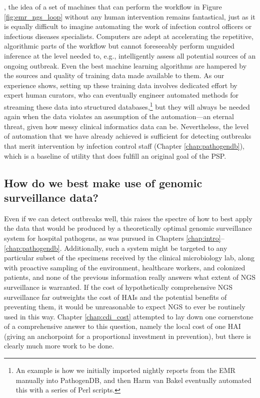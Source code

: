 , the idea of a set of machines that can perform the workflow in Figure \ref{fig:emr_ngs_loop} without any human intervention remains fantastical, just as it is equally difficult to imagine automating the work of infection control officers or infectious diseases specialists. Computers are adept at accelerating the repetitive, algorithmic parts of the workflow but cannot foreseeably perform unguided inference at the level needed to, e.g., intelligently assess all potential sources of an ongoing outbreak. Even the best machine learning algorithms are hampered by the sources and quality of training data made available to them. As our experience shows, setting up these training data involves dedicated effort by expert human curators, who can eventually engineer automated methods for streaming these data into structured databases,\footnote{An example is how we initially imported nightly reports from the EMR manually into PathogenDB, and then Harm van Bakel eventually automated this with a series of Perl scripts.} but they will always be needed again when the data violates an assumption of the automation—an eternal threat, given how messy clinical informatics data can be. Nevertheless, the level of automation that we have already achieved is sufficient for detecting outbreaks that merit intervention by infection control staff (Chapter \ref{chap:pathogendb}), which is a baseline of utility that does fulfill an original goal of the PSP.

\subsection{How do we best make use of genomic surveillance data?}

Even if we can detect outbreaks well, this raises the spectre of how to best apply the data that would be produced by a theoretically optimal genomic surveillance system for hospital pathogens, as was pursued in Chapters \ref{chap:intro}–\ref{chap:pathogendb}. Additionally, such a system might be targeted to any particular subset of the specimens received by the clinical microbiology lab, along with proactive sampling of the environment, healthcare workers, and colonized patients, and none of the previous information really answers what extent of NGS surveillance is warranted. If the cost of hypothetically comprehensive NGS surveillance far outweights the cost of HAIs and the potential benefits of preventing them, it would be unreasonable to expect NGS to ever be routinely used in this way. Chapter \ref{chap:cdi_cost} attempted to lay down one cornerstone of a comprehensive answer to this question, namely the local cost of one HAI (giving an anchorpoint for a proportional investment in prevention), but there is clearly much more work to be done.


